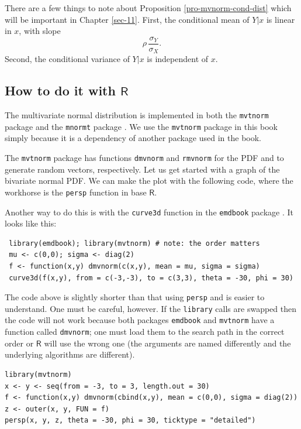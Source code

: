 \documentclass[captions=tableheading]{scrbook}
\begin{document}
There are a few things to note about Proposition \ref{pro-mvnorm-cond-dist} which will be important in Chapter \ref{sec-11}. First, the conditional mean of \(Y|x\) is linear in \(x\), with slope
\begin{equation}
\rho\,\frac{\sigma_{Y}}{\sigma_{X}}.\label{eq-population-slope-slr}
\end{equation}
Second, the conditional variance of \(Y|x\) is independent of \(x\). 
\subsection{How to do it with \(\mathsf{R}\)}
\label{sec-7-6-1}


The multivariate normal distribution is implemented in both the \texttt{mvtnorm} package \cite{Genzmvtnorm} and the \texttt{mnormt} package \cite{mnormt}. We use the \texttt{mvtnorm} package in this book simply because it is a dependency of another package used in the book. 

The \texttt{mvtnorm} package has functions \texttt{dmvnorm} and \texttt{rmvnorm} for the PDF and to generate random vectors, respectively. Let us get started with a graph of the bivariate normal PDF. We can make the plot with the following code, where the workhorse is the \texttt{persp} function in base \(\mathsf{R}\).

Another way to do this is with the \texttt{curve3d} function in the \texttt{emdbook} package \cite{emdbook}. It looks like this:
\begin{verbatim}
 library(emdbook); library(mvtnorm) # note: the order matters
 mu <- c(0,0); sigma <- diag(2)
 f <- function(x,y) dmvnorm(c(x,y), mean = mu, sigma = sigma)
 curve3d(f(x,y), from = c(-3,-3), to = c(3,3), theta = -30, phi = 30)
\end{verbatim}
The code above is slightly shorter than that using \texttt{persp} and is easier to understand. One must be careful, however. If the \texttt{library} calls are swapped then the code will not work because both packages \texttt{emdbook} and \texttt{mvtnorm} have a function called \texttt{dmvnorm}; one must load them to the search path in the correct order or \(\mathsf{R}\) will use the wrong one (the arguments are named differently and the underlying algorithms are different).


\lstset{language=R}
\begin{lstlisting}
library(mvtnorm)
x <- y <- seq(from = -3, to = 3, length.out = 30)
f <- function(x,y) dmvnorm(cbind(x,y), mean = c(0,0), sigma = diag(2))
z <- outer(x, y, FUN = f)
persp(x, y, z, theta = -30, phi = 30, ticktype = "detailed")
\end{lstlisting}
\end{document}
